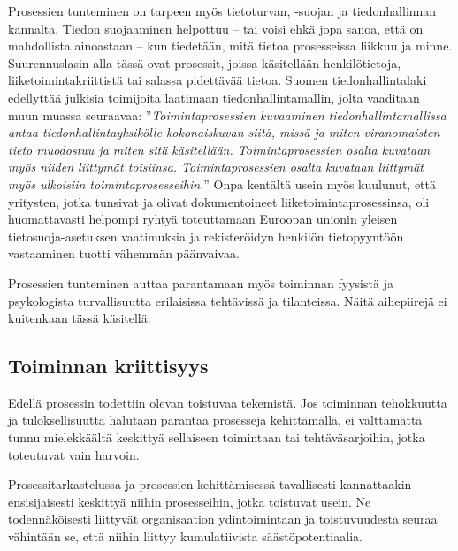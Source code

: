 \documentclass[
  finnish,
  letterpaper,
  DIV=11,
  numbers=noendperiod,
  oneside]{scrreprt}
\begin{document}
Prosessien tunteminen on tarpeen myös tietoturvan, -suojan ja
tiedonhallinnan kannalta. Tiedon suojaaminen helpottuu -- tai voisi ehkä
jopa sanoa, että on mahdollista ainoastaan -- kun tiedetään, mitä tietoa
prosesseissa liikkuu ja minne. Suurennuslasin alla tässä ovat prosessit,
joissa käsitellään henkilötietoja, liiketoimintakriittistä tai salassa
pidettävää tietoa. Suomen tiedonhallintalaki
edellyttää julkisia toimijoita laatimaan tiedonhallintamallin, jolta
vaaditaan muun muassa seuraavaa: ''\emph{Toimintaprosessien kuvaaminen
tiedonhallintamallissa antaa tiedonhallintayksikölle kokonaiskuvan
siitä, missä ja miten viranomaisten tieto muodostuu ja miten sitä
käsitellään. Toimintaprosessien osalta kuvataan myös niiden liittymät
toisiinsa. Toimintaprosessien osalta kuvataan liittymät myös ulkoisiin
toimintaprosesseihin.}'' Onpa kentältä usein myös
kuulunut, että yritysten, jotka tunsivat ja olivat dokumentoineet
liiketoimintaprosessinsa, oli huomattavasti helpompi ryhtyä toteuttamaan
Euroopan unionin yleisen tietosuoja-asetuksen
vaatimuksia ja rekisteröidyn henkilön tietopyyntöön vastaaminen tuotti
vähemmän päänvaivaa.

Prosessien tunteminen auttaa parantamaan myös toiminnan fyysistä ja
psykologista turvallisuutta erilaisissa tehtävissä ja tilanteissa. Näitä
aihepiirejä ei kuitenkaan tässä käsitellä.

\subsection{Toiminnan kriittisyys}\label{toiminnan-kriittisyys}

Edellä prosessin todettiin olevan toistuvaa tekemistä. Jos toiminnan
tehokkuutta ja tuloksellisuutta halutaan parantaa prosesseja
kehittämällä, ei välttämättä tunnu mielekkäältä keskittyä sellaiseen
toimintaan tai tehtäväsarjoihin, jotka toteutuvat vain harvoin.

Prosessitarkastelussa ja prosessien kehittämisessä tavallisesti
kannattaakin ensisijaisesti keskittyä niihin prosesseihin, jotka
toistuvat usein. Ne todennäköisesti liittyvät organisaation
ydintoimintaan ja toistuvuudesta seuraa vähintään se, että niihin
liittyy kumulatiivista säästöpotentiaalia.
\end{document}
